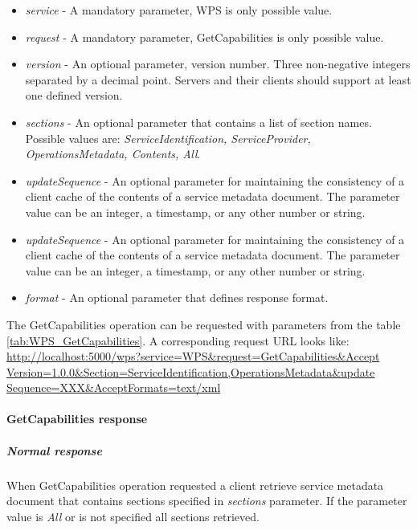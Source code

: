 \documentclass[12pt,a4paper]{article}
\begin{document}
\begin{itemize}
\item\textit{service} - A mandatory parameter, WPS is only possible value.
\item\textit{request} - A mandatory parameter, GetCapabilities is only possible value.
\item\textit{version} - An optional parameter, version number. Three non-negative integers separated by a decimal point. Servers and
their clients should support at least one defined version.
\item\textit{sections} - An optional parameter that contains a list of section names. Possible values are: \textit{ServiceIdentification,
ServiceProvider, OperationsMetadata, Contents, All}.
\item\textit{updateSequence} - An optional parameter for maintaining the consistency of a client cache of the contents of a service
metadata document. The parameter value can be an integer, a timestamp, or any other number or string.
\item\textit{updateSequence} - An optional parameter for maintaining the consistency of a client cache of the contents of a service
metadata document. The parameter value can be an integer, a timestamp, or any other number or string.
\item\textit{format} - An optional parameter that defines response format.
\end{itemize}

The GetCapabilities operation can be requested with parameters from the table \ref{tab:WPS_GetCapabilities}. A corresponding
request URL looks like:
\url{http://localhost:5000/wps?service=WPS&request=GetCapabilities&Accept
Version=1.0.0&Section=ServiceIdentification,OperationsMetadata&update
Sequence=XXX&AcceptFormats=text/xml}

\bigskip
\paragraph{GetCapabilities response}
\label{para:GetCapa_response}
\subparagraph{Normal response}
When GetCapabilities operation requested a client retrieve service metadata document that contains sections specified in
\textit{sections} parameter. If the parameter value is \textit{All} or is not specified all sections retrieved.
\end{document}
